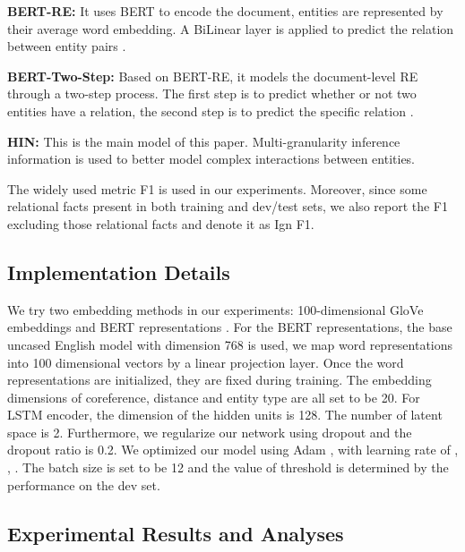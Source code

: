 \documentclass[runningheads]{llncs}
\begin{document}
\textbf{BERT-RE:}
It uses BERT to encode the document, entities are represented by their average word embedding.
A BiLinear layer is applied to predict the relation between entity pairs \cite{wang2019fine}.

\textbf{BERT-Two-Step:}
Based on BERT-RE, it models the document-level RE through a two-step process. The first step is to predict whether or not two entities have a relation, the second step is to predict the specific relation \cite{wang2019fine}.

\textbf{HIN:}
This is the main model of this paper. Multi-granularity inference information is used to better model complex interactions between entities.

The widely used metric F1 is used in our experiments. Moreover, since some relational facts present in both training and dev/test sets, we also report the F1 excluding those relational facts and denote it as Ign F1.

\subsection{Implementation Details}
We try two embedding methods in our experiments: 100-dimensional GloVe \cite{pennington2014glove} embeddings and BERT representations \cite{devlin2018bert}.
For the BERT representations, the base uncased English model with dimension 768 is used, we map word representations into 100 dimensional vectors by a linear projection layer.
Once the word representations are initialized, they are fixed during training.
The embedding dimensions of coreference, distance and entity type are all set to be 20.
For LSTM encoder, the dimension of the hidden units is 128.
The number of latent space is 2.
Furthermore, we regularize our network using dropout and the dropout ratio is 0.2.
We optimized our model using Adam \cite{kingma2014adam}, with learning rate of , , .
The batch size is set to be 12 and the value of threshold  is determined by the performance on the dev set.

\subsection{Experimental Results and Analyses}
\end{document}
